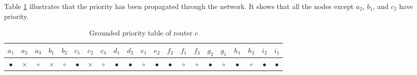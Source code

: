 \begin{BehExample}
Table \ref{tab:j12} illustrates that the priority has been propagated through the network. It shows that all the nodes except $a_2$, $b_1$, and $c_2$ have  priority. 

\begin{table}
{\setlength\tabcolsep{3.25pt}
\noindent
\begin{tabular}{|c|c|c|c|c|c|c|c|c|c|c|c|c|c|c|c|c|c|c|c|c|}
  \hline
$a_1$ & $a_2$ & $a_3$ & $b_1$ & $b_2$ & $c_1$ & $c_2$ & $c_3$ & $d_1$ & $d_2$ & $e_1$ & $e_2$ & $f_2$ & $f_1$ & $f_3$ & $g_2$ & $g_1$ & $h_1$ & $h_2$ & $i_2$ & $i_1$ \\ 
\hline
$\bullet$ & $\times$ & $\circ$ & $\times$ & $\circ$ & $\bullet$ & $\times$ & $\circ$ & $\bullet$ & $\bullet$ & $\circ$ & $\bullet$ & $\bullet$ & $\circ$ & $\circ$ & $\bullet$ & $\circ$ & $\bullet$ & $\circ$ & $\bullet$ & $\bullet$ \\ 
\hline
\end{tabular}
}
\caption{Grounded priority table of router $c$}
\label{tab:j12}
\end{table}
\end{BehExample}



